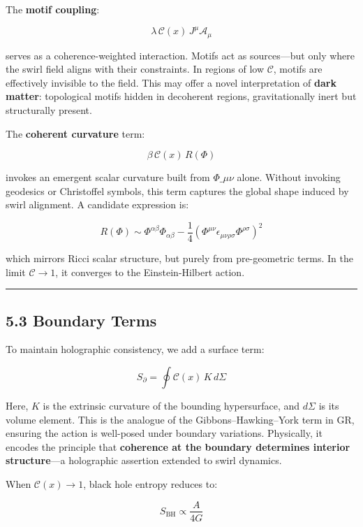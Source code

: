 \documentclass[
  11pt,
]{article}
\begin{document}
The \textbf{motif coupling}:

\[
\lambda\, \mathcal{C}(x)\, J^\mu \mathcal{A}_\mu
\]

serves as a coherence-weighted interaction. Motifs act as sources---but
only where the swirl field aligns with their constraints. In regions of
low \(\mathcal{C}\), motifs are effectively invisible to the field. This
may offer a novel interpretation of \textbf{dark matter}: topological
motifs hidden in decoherent regions, gravitationally inert but
structurally present.

The \textbf{coherent curvature} term:

\[
\beta\, \mathcal{C}(x)\, R(\Phi)
\]

invokes an emergent scalar curvature built from \(\Phi\_{\mu\nu}\)
alone. Without invoking geodesics or Christoffel symbols, this term
captures the global shape induced by swirl alignment. A candidate
expression is:

\[
R(\Phi) \sim \Phi^{\alpha\beta} \Phi_{\alpha\beta} - \frac{1}{4} \left( \Phi^{\mu\nu} \epsilon_{\mu\nu\rho\sigma} \Phi^{\rho\sigma} \right)^2
\]

which mirrors Ricci scalar structure, but purely from pre-geometric
terms. In the limit \(\mathcal{C} \to 1\), it converges to the
Einstein-Hilbert action.

\begin{center}\rule{0.5\linewidth}{0.5pt}\end{center}

\subsection{5.3 Boundary Terms}\label{boundary-terms}

To maintain holographic consistency, we add a surface term:

\[
S_{\partial} = \oint \mathcal{C}(x)\, K\, d\Sigma
\]

Here, \(K\) is the extrinsic curvature of the bounding hypersurface, and
\(d\Sigma\) is its volume element. This is the analogue of the
Gibbons--Hawking--York term in GR, ensuring the action is well-posed
under boundary variations. Physically, it encodes the principle that
\textbf{coherence at the boundary determines interior structure}---a
holographic assertion extended to swirl dynamics.

When \(\mathcal{C}(x) \to 1\), black hole entropy reduces to:

\[
S_{\text{BH}} \propto \frac{A}{4G}
\]
\end{document}
